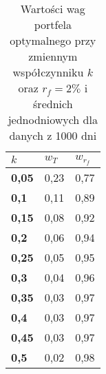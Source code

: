 \documentclass[magister]{dyplom}
\begin{document}
\begin{table}[ht]
	\centering
	\caption{Wartości wag portfela optymalnego przy zmiennym współczynniku $k$ oraz $r_f = 2\%$ i średnich jednodniowych dla danych z 1000 dni}
	\begin{tabular}{|l|l|l|}
		\hline
		\textbf{$k$} & \textbf{$w_T$} & \textbf{$w_{r_f}$} \\ \hline
		\textbf{0,05}                                             & 0,23          & 0,77           \\ \hline
		\textbf{0,1}                                              & 0,11          & 0,89           \\ \hline
		\textbf{0,15}                                             & 0,08          & 0,92           \\ \hline
		\textbf{0,2}                                              & 0,06          & 0,94           \\ \hline
		\textbf{0,25}                                             & 0,05          & 0,95           \\ \hline
		\textbf{0,3}                                              & 0,04          & 0,96           \\ \hline
		\textbf{0,35}                                             & 0,03          & 0,97           \\ \hline
		\textbf{0,4}                                              & 0,03          & 0,97           \\ \hline
		\textbf{0,45}                                             & 0,03          & 0,97           \\ \hline
		\textbf{0,5}                                              & 0,02          & 0,98           \\ \hline
	\end{tabular}
\end{table}
\newpage
\end{document}
